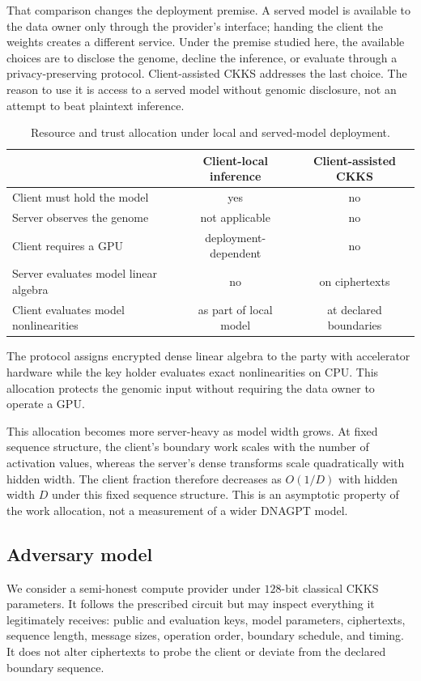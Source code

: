 That comparison changes the deployment premise. A served model is available to the data owner only
through the provider's interface; handing the client the weights creates a different service. Under
the premise studied here, the available choices are to disclose the genome, decline the inference,
or evaluate through a privacy-preserving protocol. Client-assisted CKKS addresses the last choice.
The reason to use it is access to a served model without genomic disclosure, not an attempt to beat
plaintext inference.

\begin{table}[t]\centering\small
\caption{Resource and trust allocation under local and served-model deployment.}
\label{tab:deployments}
\begin{tabularx}{\textwidth}{Y c c}
\toprule
 & Client-local inference & Client-assisted CKKS \\
\midrule
Client must hold the model & yes & no \\
Server observes the genome & not applicable & no \\
Client requires a GPU & deployment-dependent & no \\
Server evaluates model linear algebra & no & on ciphertexts \\
Client evaluates model nonlinearities & as part of local model & at declared boundaries \\
\bottomrule
\end{tabularx}
\end{table}

The protocol assigns encrypted dense linear algebra to the party with accelerator hardware while
the key holder evaluates exact nonlinearities on CPU. This allocation protects the genomic input
without requiring the data owner to operate a GPU.

This allocation becomes more server-heavy as model width grows. At fixed sequence structure, the
client's boundary work scales with the number of activation values, whereas the server's dense
transforms scale quadratically with hidden width. The client fraction therefore decreases as
$O(1/D)$ with hidden width $D$ under this fixed sequence structure. This is an asymptotic property
of the work allocation, not a measurement of a wider DNAGPT model.

\subsection{Adversary model}
We consider a semi-honest compute provider under $128$-bit classical CKKS parameters. It follows
the prescribed circuit but may inspect everything it legitimately receives: public and evaluation
keys, model parameters, ciphertexts, sequence length, message sizes, operation order, boundary
schedule, and timing. It does not alter ciphertexts to probe the client or deviate from the
declared boundary sequence.

